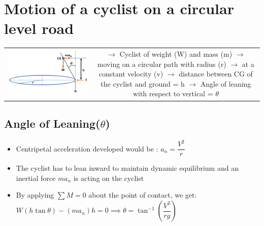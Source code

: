 \documentclass[8pt]{report}
\begin{document}
\section{Motion of a cyclist on a circular level road}
	\begin{table}[H]
		\centering
		\begin{tabular}{cc}
			\parbox{9cm}{\includegraphics[scale=0.5]{cyclist_circular.png}} & 
			\parbox{12cm}{$\rightarrow$ Cyclist of weight (W) and mass (m)\\\\$\rightarrow$ moving on a circular path with radius (r)\\\\$\rightarrow$ at a constant velocity (v)\\\\$\rightarrow$ distance between CG of the cyclist and ground = h\\\\$\rightarrow$ Angle of leaning with respect to vertical = $\theta$}
		\end{tabular}
	\end{table}
	\subsection{Angle of Leaning($\theta$)}
		\begin{itemize}
			\item Centripetal acceleration developed would be : $a_n = \dfrac{V^2}{r}$
			\item The cyclist has to lean inward to maintain dynamic equilibrium and an inertial force $ma_n$ is acting on the cyclist
			\item By applying $\sum M=0$ about the point of contact, we get: $W(h\tan\theta)-(ma_n)h=0 \implies \boxed{\theta=\tan^{-1}\left(\dfrac{V^2}{rg}\right)}$ 
		\end{itemize}
\end{document}
